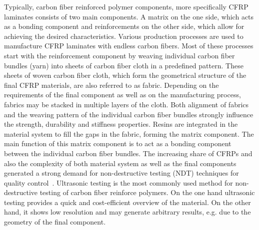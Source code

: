 Typically,  carbon fiber reinforced polymer components, more specifically CFRP laminates consists of two main components.
A matrix on the one side, which acts as a bonding component and  reinforcements on the other side, which allow for achieving the desired characteristics.  Various production processes are used to manufacture CFRP laminates with endless carbon fibers. Most of these processes start with the reinforcement component by weaving individual carbon fiber bundles (yarn) into sheets of carbon fiber cloth in a predefined pattern. These sheets of woven carbon fiber cloth, which form the geometrical structure of the final CFRP materials, are also referred to as fabric. Depending on the requirements of the final component as well as on the manufacturing process, fabrics may be stacked in multiple layers of the cloth. Both alignment of fabrics and the weaving pattern of the individual carbon fiber bundles strongly influence the strength, durability and stiffness properties. Resins are integrated in the material system to fill the gaps in the fabric, forming the matrix component. The main function of this matrix component is to act as a bonding component between the individual carbon fiber bundles. 
The increasing share of CFRPs and also the complexity of both material system as well as the final components generated a strong demand for non-destructive testing (NDT) techniques for quality control~\cite{Red2012}. Ultrasonic testing is the most commonly used method for non-destructive testing of carbon fiber reinforce polymers. On the one hand ultrasonic testing provides a quick and cost-efficient overview of the material. On the other hand, it shows low resolution and may generate arbitrary results, e.g. due to the geometry of the final component. 

